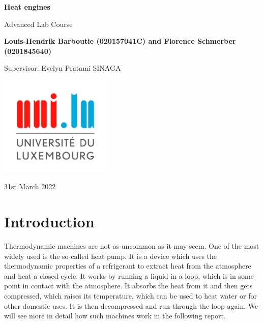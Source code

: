 \documentclass{scrartcl}
\begin{document}
\begin{titlepage}
    \begin{center}
        \vspace*{1cm}
        \Huge
        \textbf{Heat engines}
        
        \vspace{0.5cm}
        \LARGE
        Advanced Lab Course
        
        \vspace{1.5cm}
        \textbf{Louis-Hendrik Barboutie (020157041C) and Florence Schmerber (0201845640)}
        
        \vspace{1cm}
        Supervisor: Evelyn Pratami SINAGA
        \vfill
        

        \includegraphics[width=0.4\textwidth]{logo_uni.jpg}
        
        \Large
        31st March 2022
    \end{center}
\end{titlepage}

\clearpage

\tableofcontents

\listoffigures
	
\clearpage

\section{Introduction}
Thermodynamic machines are not as uncommon as it may seem. One of the most widely used is the so-called heat pump. It is a device which uses the thermodynamic properties of a refrigerant to extract heat from the atmosphere and heat a closed cycle. It works by running a liquid in a loop, which is in some point in contact with the atmosphere. It absorbs the heat from it and then gets compressed, which raises its temperature, which can be used to heat water or for other domestic uses. It is then decompressed and run through the loop again. We will see more in detail how such machines work in the following report.
\end{document}
